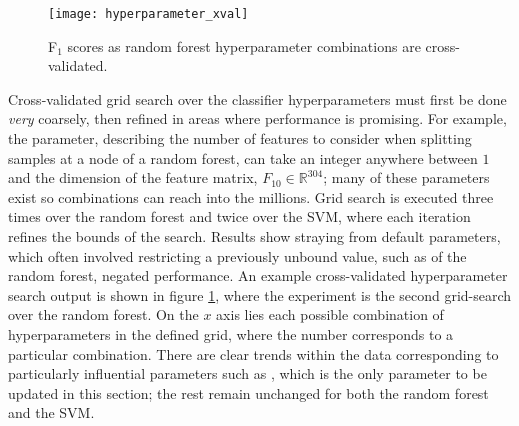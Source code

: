             \begin{figure}[ht]
                \centering
                \texttt{[image: hyperparameter\_xval]}
                \caption{F$_{1}$ scores as random forest hyperparameter combinations are cross-validated.}
                \label{fig:exp-clf-opt-hyp}
            \end{figure}
            
            Cross-validated grid search over the classifier hyperparameters must first be done \textit{very} coarsely, then refined in areas where performance is promising. For example, the  parameter, describing the number of features to consider when splitting samples at a node of a random forest, can take an integer anywhere between $1$ and the dimension of the feature matrix, $F_{10} \in \mathbb{R}^{304}$; many of these parameters exist so combinations can reach into the millions. Grid search is executed three times over the random forest and twice over the SVM, where each iteration refines the bounds of the search. Results show straying from default parameters, which often involved restricting a previously unbound value, such as  of the random forest, negated performance. An example cross-validated hyperparameter search output is shown in figure \ref{fig:exp-clf-opt-hyp}, where the experiment is the second grid-search over the random forest. On the $x$ axis lies each possible combination of hyperparameters in the defined grid, where the number corresponds to a particular combination. There are clear trends within the data corresponding to particularly influential parameters such as , which is the only parameter to be updated in this section; the rest remain unchanged for both the random forest and the SVM. 
            
            
            
            
